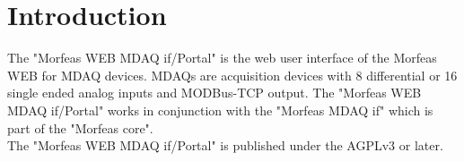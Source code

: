 \section{Introduction}
The "Morfeas WEB MDAQ if/Portal" is the web user interface of the Morfeas WEB for MDAQ devices.
MDAQs are acquisition devices with 8 differential or 16 single ended analog inputs and MODBus-TCP output.
The "Morfeas WEB MDAQ if/Portal" works in conjunction with the "Morfeas MDAQ if" which is part of the "Morfeas core".\\

\noindent The "Morfeas WEB MDAQ if/Portal" is published under the AGPLv3 or later.